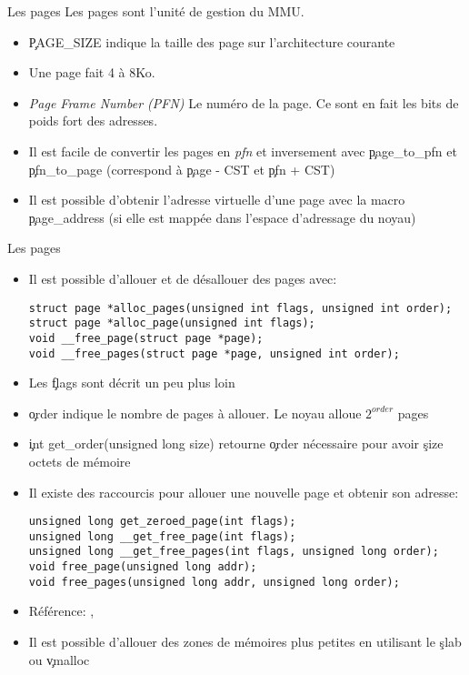\begin{frame}[fragile=singleslide]{Les pages}
  Les pages sont l'unité de gestion du MMU. 
  \begin{itemize} 
  \item \c{PAGE_SIZE}  indique la  taille des page  sur l'architecture
    courante
  \item Une page fait 4 à 8Ko.
  \item \emph{Page Frame  Number (PFN)} Le numéro de  la page. Ce sont
    en fait les bits de poids fort des adresses.
  \item  Il  est  facile  de  convertir les  pages  en  \emph{pfn}  et
    inversement avec \c{page_to_pfn}  et \c{pfn_to_page} (correspond à
    \c{page - CST} et \c{pfn + CST})
  \item Il est possible  d'obtenir l'adresse virtuelle d'une page avec
    la  macro  \c{page_address}  (si  elle est  mappée  dans  l'espace
    d'adressage du noyau)
  \end{itemize}
\end{frame}

\begin{frame}[fragile=singleslide]{Les pages}
  \begin{itemize} 
  \item Il est possible d'allouer et de désallouer des pages avec:
    \begin{lstlisting} 
struct page *alloc_pages(unsigned int flags, unsigned int order);
struct page *alloc_page(unsigned int flags);
void __free_page(struct page *page);
void __free_pages(struct page *page, unsigned int order);
    \end{lstlisting} 
  \item Les \c{flags} sont décrit un peu plus loin
  \item  \c{order} indique  le nombre  de  pages à  allouer. Le  noyau
    alloue $2^{order}$ pages
  \item  \c{int  get_order(unsigned  long  size)}  retourne  \c{order}
    nécessaire pour avoir \c{size} octets de mémoire
  \item Il  existe des  raccourcis pour allouer  une nouvelle  page et
    obtenir son adresse:
    \begin{lstlisting} 
unsigned long get_zeroed_page(int flags);
unsigned long __get_free_page(int flags);
unsigned long __get_free_pages(int flags, unsigned long order);
void free_page(unsigned long addr);
void free_pages(unsigned long addr, unsigned long order);
    \end{lstlisting} 
  \item Référence: , 
  \item Il est  possible d'allouer des zones de  mémoires plus petites
    en utilisant le \c{slab} ou \c{vmalloc}
  \end{itemize} 
\end{frame} 

